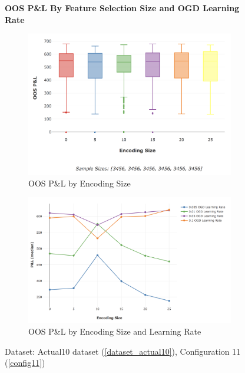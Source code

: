 \documentclass[a4paper,11pt,oneside]{article}
\theoremstyle{plain}
\theoremstyle{definition}
\begin{document}
	\begin{figure}[H]
		\centering 
		\textbf{OOS P\&L By Feature Selection Size and OGD Learning Rate}
		\begin{subfigure}{1.0\linewidth}
			\includegraphics[scale=0.4]{images/results/primary/OOS_Encoding_PL_Box.png} 
			\caption[OOS P\&L by Encoding Size]{OOS P\&L by Encoding Size}
			\label{figure_OOS_Encoding_PL_Box}
		\end{subfigure}	
		\begin{subfigure}{1.0\linewidth}
			\includegraphics[scale=0.5]{images/results/feature_selection/encoding_pl_median.png} 
			\caption[OOS P\&L by Encoding Size and Learning Rate]{OOS P\&L by Encoding Size and Learning Rate}
		\end{subfigure}	
		\caption[OOS P\&L By Feature Selection Size and OGD Learning Rate]
		{Dataset: Actual10 dataset (\ref{dataset_actual10}), Configuration 11 (\ref{config11})		
}
\end{figure}
\end{document}
